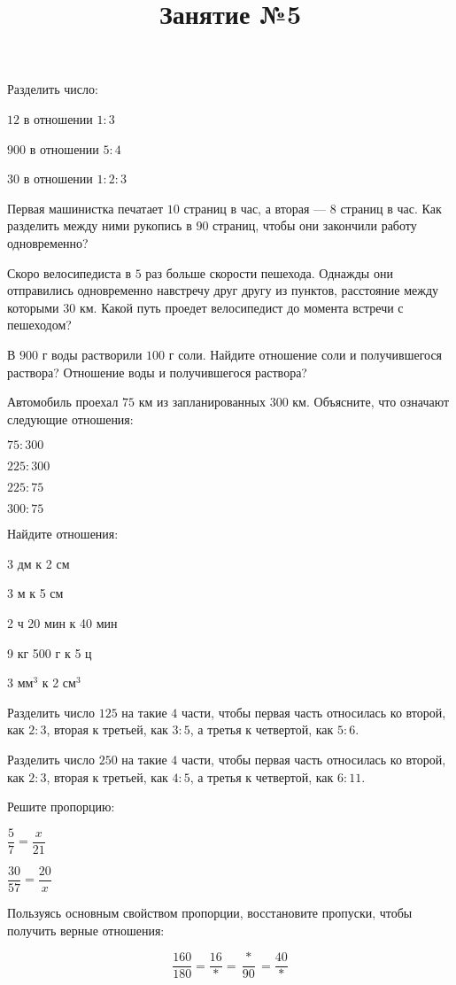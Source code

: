 \newpage
\title{Занятие №5}
\begin{listofex}
	\item Разделить число:
	\begin{enumcols}[itemcolumns=2]
		\item \( 12 \) в отношении \( 1:3 \)
		\item \( 900 \) в отношении \( 5:4 \)
		\item \( 30 \) в отношении \( 1:2:3 \)
	\end{enumcols}
	\item Первая машинистка печатает \( 10 \) страниц в час, а вторая --- \( 8 \) страниц в час. Как разделить между ними рукопись в \( 90 \) страниц, чтобы они закончили работу одновременно?
	\item Скоро велосипедиста в \( 5 \) раз больше скорости пешехода. Однажды они отправились одновременно навстречу друг другу из пунктов, расстояние между которыми \( 30 \) км. Какой путь проедет велосипедист до момента встречи с пешеходом?
	\item В \( 900 \) г воды растворили \( 100 \) г соли. Найдите отношение соли и получившегося раствора? Отношение воды и получившегося раствора?
	\item Автомобиль проехал \( 75 \) км из запланированных \( 300 \) км. Объясните, что означают следующие отношения:
	\begin{enumcols}[itemcolumns=4]
		\item \( 75:300 \)
		\item \( 225:300 \)
		\item \( 225:75 \)
		\item \( 300:75 \)
	\end{enumcols}
	\item Найдите отношения:
	\begin{enumcols}[itemcolumns=3]
		\item 3 дм к 2 см
		\item 3 м к 5 см
		\item 2 ч 20 мин к 40 мин
		\item 9 кг 500 г к 5 ц
		\item 3 мм\( ^3 \) к 2 см\( ^3 \)
	\end{enumcols}
	\item Разделить число \( 125 \) на такие \( 4 \) части, чтобы первая часть относилась ко второй, как \( 2:3 \), вторая к третьей, как \( 3:5 \), а третья к четвертой, как \( 5:6 \).
	\item Разделить число \( 250 \) на такие \( 4 \) части, чтобы первая часть относилась ко второй, как \( 2:3 \), вторая к третьей, как \( 4:5 \), а третья к четвертой, как \( 6:11 \).
	\item Решите пропорцию:
	\begin{enumcols}[itemcolumns=2]
		\item \( \dfrac{5}{7}=\dfrac{x}{21} \)
		\item \( \dfrac{30}{57}=\dfrac{20}{x} \)
	\end{enumcols}
	\item Пользуясь основным свойством пропорции, восстановите пропуски, чтобы получить верные отношения:
	
	\[ \dfrac{160}{180}=\dfrac{16}{*}=\dfrac{*}{90}=\dfrac{40}{*} \]
\end{listofex}
